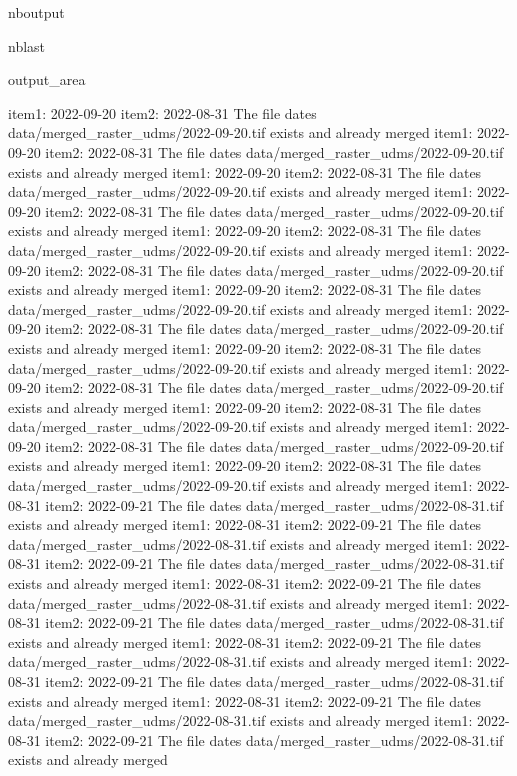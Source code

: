 \documentclass[letterpaper,10pt]{sphinxmanual}
\begin{document}
\begin{sphinxuseclass}{nboutput}
\begin{sphinxuseclass}{nblast}
{\begin{sphinxuseclass}{output_area}
\begin{sphinxuseclass}{}
\begin{sphinxVerbatim}[commandchars=\\\{\}]
item1:  2022-09-20
item2:  2022-08-31
The file dates data/merged\_raster\_udms/2022-09-20.tif exists and already merged
item1:  2022-09-20
item2:  2022-08-31
The file dates data/merged\_raster\_udms/2022-09-20.tif exists and already merged
item1:  2022-09-20
item2:  2022-08-31
The file dates data/merged\_raster\_udms/2022-09-20.tif exists and already merged
item1:  2022-09-20
item2:  2022-08-31
The file dates data/merged\_raster\_udms/2022-09-20.tif exists and already merged
item1:  2022-09-20
item2:  2022-08-31
The file dates data/merged\_raster\_udms/2022-09-20.tif exists and already merged
item1:  2022-09-20
item2:  2022-08-31
The file dates data/merged\_raster\_udms/2022-09-20.tif exists and already merged
item1:  2022-09-20
item2:  2022-08-31
The file dates data/merged\_raster\_udms/2022-09-20.tif exists and already merged
item1:  2022-09-20
item2:  2022-08-31
The file dates data/merged\_raster\_udms/2022-09-20.tif exists and already merged
item1:  2022-09-20
item2:  2022-08-31
The file dates data/merged\_raster\_udms/2022-09-20.tif exists and already merged
item1:  2022-09-20
item2:  2022-08-31
The file dates data/merged\_raster\_udms/2022-09-20.tif exists and already merged
item1:  2022-09-20
item2:  2022-08-31
The file dates data/merged\_raster\_udms/2022-09-20.tif exists and already merged
item1:  2022-09-20
item2:  2022-08-31
The file dates data/merged\_raster\_udms/2022-09-20.tif exists and already merged
item1:  2022-09-20
item2:  2022-08-31
The file dates data/merged\_raster\_udms/2022-09-20.tif exists and already merged
item1:  2022-08-31
item2:  2022-09-21
The file dates data/merged\_raster\_udms/2022-08-31.tif exists and already merged
item1:  2022-08-31
item2:  2022-09-21
The file dates data/merged\_raster\_udms/2022-08-31.tif exists and already merged
item1:  2022-08-31
item2:  2022-09-21
The file dates data/merged\_raster\_udms/2022-08-31.tif exists and already merged
item1:  2022-08-31
item2:  2022-09-21
The file dates data/merged\_raster\_udms/2022-08-31.tif exists and already merged
item1:  2022-08-31
item2:  2022-09-21
The file dates data/merged\_raster\_udms/2022-08-31.tif exists and already merged
item1:  2022-08-31
item2:  2022-09-21
The file dates data/merged\_raster\_udms/2022-08-31.tif exists and already merged
item1:  2022-08-31
item2:  2022-09-21
The file dates data/merged\_raster\_udms/2022-08-31.tif exists and already merged
item1:  2022-08-31
item2:  2022-09-21
The file dates data/merged\_raster\_udms/2022-08-31.tif exists and already merged
item1:  2022-08-31
item2:  2022-09-21
The file dates data/merged\_raster\_udms/2022-08-31.tif exists and already merged

\end{sphinxVerbatim}
\end{sphinxuseclass}
\end{sphinxuseclass}}
\end{sphinxuseclass}
\end{sphinxuseclass}
\end{document}
